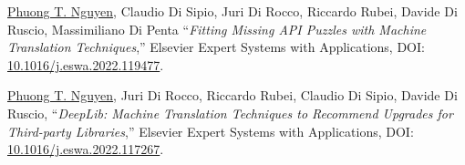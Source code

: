 \documentclass[a4paper,8pt]{article} %
\begin{document}
\begin{thebibliography}{100}

	
	

	\underline{Phuong T. Nguyen}, Claudio Di Sipio, Juri Di Rocco, Riccardo Rubei, Davide Di Ruscio, Massimiliano Di Penta ``\emph{Fitting Missing API Puzzles with Machine Translation Techniques},'' Elsevier Expert Systems with Applications, DOI: \href{https://doi.org/10.1016/j.eswa.2022.119477}{10.1016/j.eswa.2022.119477}. 
	

	\underline{Phuong T. Nguyen}, Juri Di Rocco, Riccardo Rubei, Claudio Di Sipio, Davide Di Ruscio, ``\emph{DeepLib: Machine Translation Techniques to Recommend Upgrades for Third-party Libraries},'' Elsevier Expert Systems with Applications, DOI: \href{https://doi.org/10.1016/j.eswa.2022.117267}{10.1016/j.eswa.2022.117267}.

%	
	

\end{thebibliography}
\end{document}
